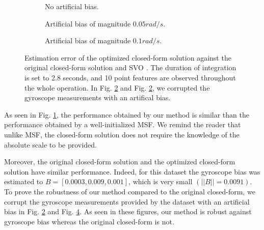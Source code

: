 \documentclass[letterpaper, 10 pt, conference]{ieeeconf}  %
\begin{document}
\begin{figure}
  \centering
  \begin{subfigure}[b]{0.7\columnwidth}
   \resizebox{\columnwidth}{!}{}
    \caption{No artificial bias.\label{fig:valid}}
  \end{subfigure}
  \begin{subfigure}[b]{0.489\columnwidth}
    \resizebox{\columnwidth}{!}{}
    \caption{Artificial bias of magnitude $0.05 rad/s$.\label{fig:validBias1}}
  \end{subfigure}
  \begin{subfigure}[b]{0.489\columnwidth}
    \resizebox{\columnwidth}{!}{}
    \caption{Artificial bias of magnitude $0.1 rad/s$.\label{fig:validBias2}}
  \end{subfigure}
  \caption{Estimation error of the optimized closed-form solution against the original closed-form solution \cite{Martinelli2014} and SVO \cite{FaesslerICRA15}.
    The duration of integration is set to 2.8 seconds, and 10 point features are observed throughout the whole operation.
    In Fig. \ref{fig:validBias1} and Fig. \ref{fig:validBias1}, we corrupted the gyroscope measurements with an artifical bias.}

\end{figure}

As seen in Fig. \ref{fig:valid}, the performance obtained by our method is similar than the performance obtained by a well-initialized MSF.
We remind the reader that unlike MSF, the closed-form solution does not require the knowledge of the absolute scale to be provided.

Moreover, the original closed-form solution and the optimized closed-form solution have similar performance.
Indeed, for this dataset the gyroscope bias was estimated to $B = [0.0003, 0.009, 0.001]$, which is very small $(||B|| = 0.0091)$.
To prove the robustness of our method compared to the original closed-form,
we corrupt the gyroscope measurements provided by the dataset with an artificial bias in Fig. \ref{fig:validBias1} and Fig. \ref{fig:validBias2}.
As seen in these figures, our method is robust against gyroscope bias whereas the original closed-form is not.

\end{document}
